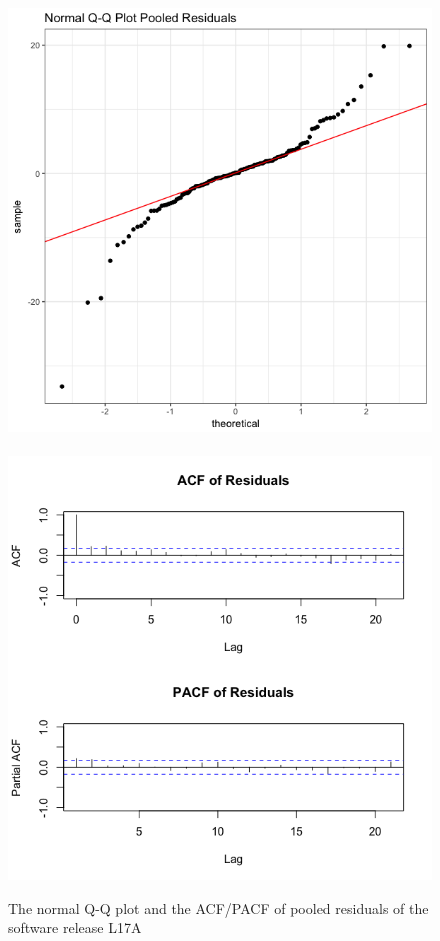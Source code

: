 \begin{figure}[H]
\begin{centering}
\includegraphics[scale=0.3]{picture/L17A_QQPool}$\quad$\includegraphics[scale=0.3]{picture/L17A_ACFPool}
\par\end{centering}
\caption{The normal Q-Q plot and the ACF/PACF of pooled residuals of the software
release L17A}
\label{L17A_plotDiag}
\end{figure}


